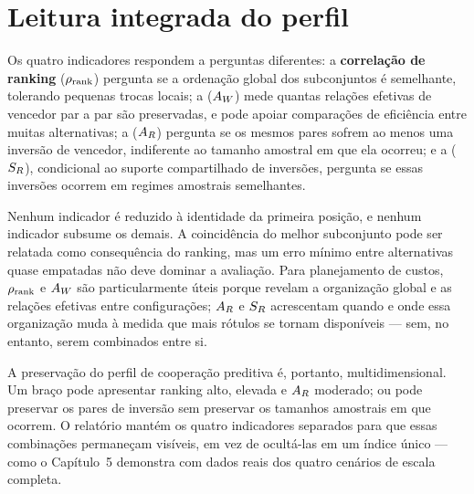 \section{Leitura integrada do perfil}

Os quatro indicadores respondem a perguntas diferentes: a \textbf{correlação de ranking} ($\rho_{\mathrm{rank}}$) pergunta se a ordenação global dos subconjuntos é semelhante, tolerando pequenas trocas locais; a \textbf{\WinnersAgreement{}} ($A_W$) mede quantas relações efetivas de vencedor par a par são preservadas, e pode apoiar comparações de eficiência entre muitas alternativas; a \textbf{\ReversalExistenceAgreement{}} ($A_R$) pergunta se os mesmos pares sofrem ao menos uma inversão de vencedor, indiferente ao tamanho amostral em que ela ocorreu; e a \textbf{\ReversalSampleSizeSimilarity{}} ($S_R$), condicional ao suporte compartilhado de inversões, pergunta se essas inversões ocorrem em regimes amostrais semelhantes.

Nenhum indicador é reduzido à identidade da primeira posição, e nenhum indicador subsume os demais. A coincidência do melhor subconjunto pode ser relatada como consequência do ranking, mas um erro mínimo entre alternativas quase empatadas não deve dominar a avaliação. Para planejamento de custos, $\rho_{\mathrm{rank}}$ e $A_W$ são particularmente úteis porque revelam a organização global e as relações efetivas entre configurações; $A_R$ e $S_R$ acrescentam quando e onde essa organização muda à medida que mais rótulos se tornam disponíveis --- sem, no entanto, serem combinados entre si.

A preservação do perfil de cooperação preditiva é, portanto, multidimensional. Um braço pode apresentar ranking alto, elevada \WinnersAgreement{} e $A_R$ moderado; ou pode preservar os pares de inversão sem preservar os tamanhos amostrais em que ocorrem. O relatório mantém os quatro indicadores separados para que essas combinações permaneçam visíveis, em vez de ocultá-las em um índice único --- como o Capítulo~5 demonstra com dados reais dos quatro cenários de escala completa.
